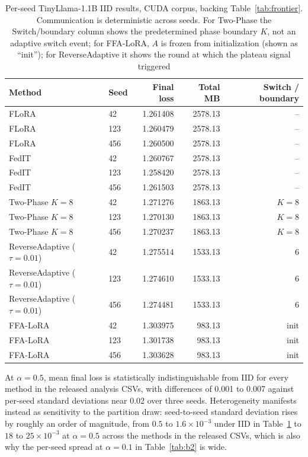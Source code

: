 \begin{table}[tbp]
\centering
\footnotesize
\scriptsize
\renewcommand{\arraystretch}{0.78}
\setlength{\tabcolsep}{6pt}
\caption{Per-seed TinyLlama-1.1B IID results, CUDA corpus, backing Table~\ref{tab:frontier}. Communication is deterministic across seeds. For Two-Phase the Switch/boundary column shows the predetermined phase boundary $K$, not an adaptive switch event; for FFA-LoRA, $A$ is frozen from initialization (shown as ``init''); for ReverseAdaptive it shows the round at which the plateau signal triggered}
\label{tab:b1}
\begin{tabular}{@{}llrrr@{}}
\toprule
Method & Seed & Final loss & Total MB & Switch / boundary \\
\midrule
FLoRA & 42 & 1.261408 & 2578.13 & -- \\
FLoRA & 123 & 1.260479 & 2578.13 & -- \\
FLoRA & 456 & 1.260500 & 2578.13 & -- \\
FedIT & 42 & 1.260767 & 2578.13 & -- \\
FedIT & 123 & 1.258420 & 2578.13 & -- \\
FedIT & 456 & 1.261503 & 2578.13 & -- \\
Two-Phase $K{=}8$ & 42 & 1.271276 & 1863.13 & $K{=}8$ \\
Two-Phase $K{=}8$ & 123 & 1.270130 & 1863.13 & $K{=}8$ \\
Two-Phase $K{=}8$ & 456 & 1.270237 & 1863.13 & $K{=}8$ \\
ReverseAdaptive ($\tau{=}0.01$) & 42 & 1.275514 & 1533.13 & 6 \\
ReverseAdaptive ($\tau{=}0.01$) & 123 & 1.274610 & 1533.13 & 6 \\
ReverseAdaptive ($\tau{=}0.01$) & 456 & 1.274481 & 1533.13 & 6 \\
FFA-LoRA & 42 & 1.303975 & 983.13 & init \\
FFA-LoRA & 123 & 1.301738 & 983.13 & init \\
FFA-LoRA & 456 & 1.303628 & 983.13 & init \\
\bottomrule
\end{tabular}
\end{table}

At $\alpha{=}0.5$, mean final loss is statistically indistinguishable from IID for every method in the released analysis CSVs, with differences of 0.001 to 0.007 against per-seed standard deviations near 0.02 over three seeds. Heterogeneity manifests instead as sensitivity to the partition draw: seed-to-seed standard deviation rises by roughly an order of magnitude, from $0.5$ to $1.6 \times 10^{-3}$ under IID in Table~\ref{tab:b1} to $18$ to $25 \times 10^{-3}$ at $\alpha{=}0.5$ across the methods in the released CSVs, which is also why the per-seed spread at $\alpha{=}0.1$ in Table~\ref{tab:b2} is wide.

